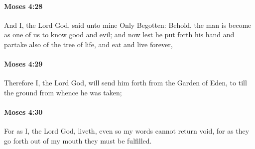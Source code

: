 		\paragraph{Moses 4:28} %
			\label{MOSES-4-28}

			And I, the Lord God, said unto mine Only Begotten: Behold, the man is become as one of us to know good and evil; and now lest he put forth his hand and partake also of the tree of life, and eat and live forever,


		\paragraph{Moses 4:29} %
			\label{MOSES-4-29}

			Therefore I, the Lord God, will send him forth from the Garden of Eden, to till the ground from whence he was taken;


		\paragraph{Moses 4:30} %
			\label{MOSES-4-30}

			For as I, the Lord God, liveth, even so my words cannot return void, for as they go forth out of my mouth they must be fulfilled.


